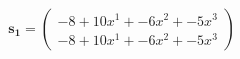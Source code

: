 \documentclass[preview]{standalone}
\begin{document}
\begin{align*}
\mathbf{s_1} = \begin{pmatrix}-8 + 10x^{1} + -6x^{2} + -5x^{3} \\ -8 + 10x^{1} + -6x^{2} + -5x^{3}\end{pmatrix}
\end{align*}
\end{document}
